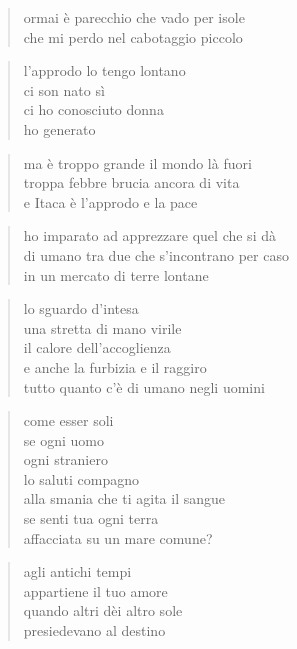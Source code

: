 	\begin{verse}
		ormai è parecchio che vado per isole\\
		che mi perdo nel cabotaggio piccolo
	\end{verse}

	\begin{verse}
		l’approdo lo tengo lontano\\
		ci son nato sì\\
		ci ho conosciuto donna\\
		ho generato
	\end{verse}

	\begin{verse}
		ma è troppo grande il mondo là fuori\\
		troppa febbre brucia ancora di vita\\
		e Itaca è l’approdo e la pace
	\end{verse}

	\begin{verse}
		ho imparato ad apprezzare quel che si dà\\
		di umano tra due che s’incontrano per caso\\
		in un mercato di terre lontane
	\end{verse}

	\begin{verse}
		lo sguardo d’intesa\\
		una stretta di mano virile\\
		il calore dell’accoglienza\\
		e anche la furbizia e il raggiro\\
		tutto quanto c’è di umano negli uomini
	\end{verse}

	\begin{verse}
		come esser soli\\
		se ogni uomo\\
		ogni straniero\\
		lo saluti compagno\\
		alla smania che ti agita il sangue\\
		se senti tua ogni terra\\
		affacciata su un mare comune?
	\end{verse}

\clearpage


\vspace*{2cm}

	\begin{verse}
                agli antichi tempi\\
                appartiene il tuo amore\\
                quando altri dèi altro sole\\
                presiedevano al destino
	\end{verse}

